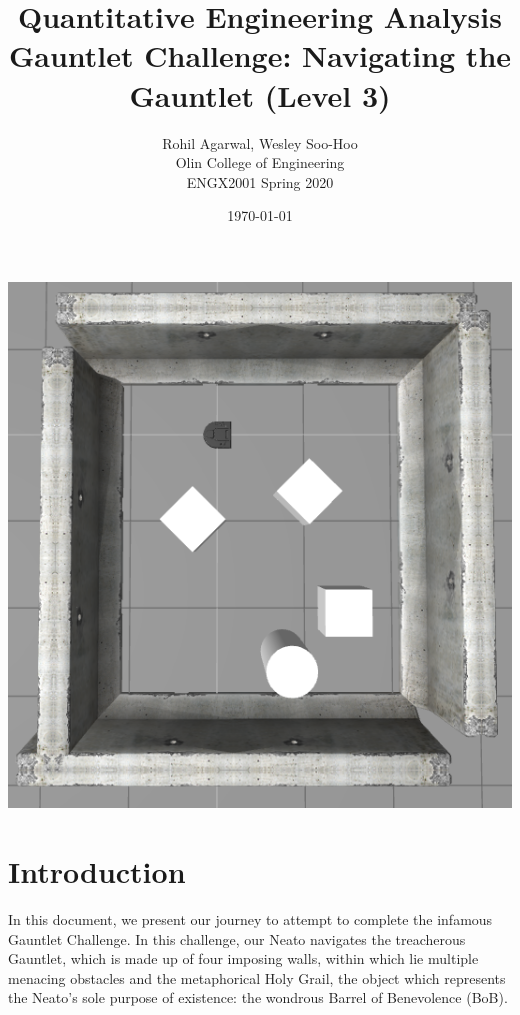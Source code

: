 
\usepackage{amsmath}

\title{Quantitative Engineering Analysis \\ Gauntlet Challenge: Navigating the Gauntlet (Level 3)}

\author{Rohil Agarwal, Wesley Soo-Hoo \\ Olin College of Engineering \\ ENGX2001 Spring 2020}
\date{\today}


\begin{titlepage}
\maketitle

\begin{center}
\includegraphics[width=.75\textwidth]{img/CaptureGauntletCover.PNG}
\end{center}
\end{titlepage}

\section{Introduction}
In this document, we present our journey to attempt to complete the infamous  Gauntlet Challenge. In this challenge, our Neato navigates the treacherous Gauntlet, which is made up of four imposing walls, within which lie multiple menacing obstacles and the metaphorical Holy Grail, the object which represents the Neato’s sole purpose of existence: the wondrous Barrel of Benevolence (BoB).

